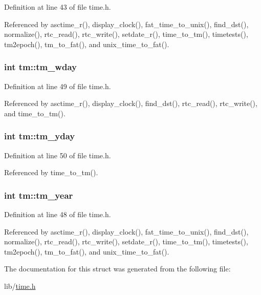 Definition at line 43 of file time.\+h.



Referenced by asctime\+\_\+r(), display\+\_\+clock(), fat\+\_\+time\+\_\+to\+\_\+unix(), find\+\_\+dst(), normalize(), rtc\+\_\+read(), rtc\+\_\+write(), setdate\+\_\+r(), time\+\_\+to\+\_\+tm(), timetests(), tm2epoch(), tm\+\_\+to\+\_\+fat(), and unix\+\_\+time\+\_\+to\+\_\+fat().

\subsubsection[{\texorpdfstring{tm\+\_\+wday}{tm_wday}}]{\setlength{\rightskip}{0pt plus 5cm}int tm\+::tm\+\_\+wday}\hypertarget{structtm_afe81a8c46f1c693c43f259b288859f4f}{}\label{structtm_afe81a8c46f1c693c43f259b288859f4f}


Definition at line 49 of file time.\+h.



Referenced by asctime\+\_\+r(), display\+\_\+clock(), find\+\_\+dst(), rtc\+\_\+read(), rtc\+\_\+write(), and time\+\_\+to\+\_\+tm().

\subsubsection[{\texorpdfstring{tm\+\_\+yday}{tm_yday}}]{\setlength{\rightskip}{0pt plus 5cm}int tm\+::tm\+\_\+yday}\hypertarget{structtm_a93a0ba77cc23796df84405dcbcc57eb1}{}\label{structtm_a93a0ba77cc23796df84405dcbcc57eb1}


Definition at line 50 of file time.\+h.



Referenced by time\+\_\+to\+\_\+tm().

\subsubsection[{\texorpdfstring{tm\+\_\+year}{tm_year}}]{\setlength{\rightskip}{0pt plus 5cm}int tm\+::tm\+\_\+year}\hypertarget{structtm_a33adf78fd6476b2120ce3b9c4a852053}{}\label{structtm_a33adf78fd6476b2120ce3b9c4a852053}


Definition at line 48 of file time.\+h.



Referenced by asctime\+\_\+r(), display\+\_\+clock(), fat\+\_\+time\+\_\+to\+\_\+unix(), find\+\_\+dst(), normalize(), rtc\+\_\+read(), rtc\+\_\+write(), setdate\+\_\+r(), time\+\_\+to\+\_\+tm(), timetests(), tm2epoch(), tm\+\_\+to\+\_\+fat(), and unix\+\_\+time\+\_\+to\+\_\+fat().



The documentation for this struct was generated from the following file\+:\begin{DoxyCompactItemize}
\item 
lib/\hyperlink{time_8h}{time.\+h}\end{DoxyCompactItemize}
